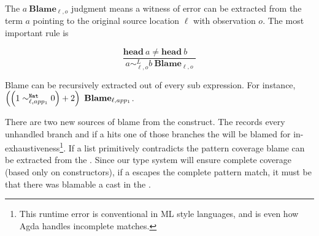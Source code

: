 The $a\ \mathbf{Blame}_{\ell,o}$ judgment means a witness of error can be extracted from the term $a$ pointing to the original source location $\ell$ with observation $o$.
The most important rule is

\[
\frac{\mathbf{head}\ a\neq\mathbf{head}\ b\quad}{a\sim_{\ell,o}^{L}b\ \mathbf{Blame}_{\ell,o}}
\]

Blame can be recursively extracted out of every sub expression.
For instance, $\left(\left(1\sim_{\ell,app_{1}}^{\mathtt{Nat}{} }0\right)+2\right)\ \mathbf{Blame}_{\ell,app_{1}}$.

There are two new sources of blame from the \case{} construct.
The \clang{} records every unhandled branch and if a \scrut{} hits one of those branches the \case{} will be blamed for in-exhaustiveness\footnote{
  This runtime error is conventional in ML style languages, and is even how Agda handles incomplete matches.
}.
If a \scrut{} list primitively contradicts the pattern coverage blame can be extracted from the \scrut{}. 
Since our type system will ensure complete coverage (based only on constructors), if a \scrut{} escapes the complete pattern match, it must be that there was blamable a cast in the \scrut.







